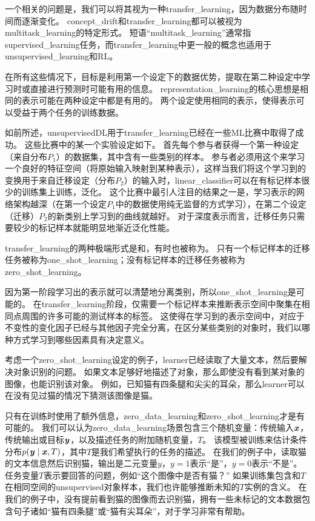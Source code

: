 
一个相关的问题是，我们可以将其视为一种\gls{transfer_learning}，因为数据分布随时间而逐渐变化。
\gls{concept_drift}和\gls{transfer_learning}都可以被视为\gls{multitask_learning}的特定形式。
短语``\gls{multitask_learning}''通常指\gls{supervised_learning}任务，而\gls{transfer_learning}中更一般的概念也适用于\gls{unsupervised_learning}和\gls{RL}。

在所有这些情况下，目标是利用第一个设定下的数据优势，提取在第二种设定中学习时或直接进行预测时可能有用的信息。
\gls{representation_learning}的核心思想是相同的表示可能在两种设定中都是有用的。
两个设定使用相同的表示，使得表示可以受益于两个任务的训练数据。


如前所述，\gls{unsupervised}\gls{DL}用于\gls{transfer_learning}已经在一些\gls{ML}比赛中取得了成功\citep{UTLC+LISA-2011-small,goodfellow+all-NIPS2011}。
这些比赛中的某一个实验设定如下。
首先每个参与者获得一个第一种设定（来自分布$P_1$）的数据集，其中含有一些类别的样本。
参与者必须用这个来学习一个良好的特征空间（将原始输入映射到某种表示），这样当我们将这个学习到的变换用于来自迁移设定（分布$P_2$）的输入时，\gls{linear_classifier}可以在有标记样本很少的训练集上训练，泛化。
这个比赛中最引人注目的结果之一是，学习表示的网络架构越深（在第一个设定$P_1$中的数据使用纯无监督的方式学习），在第二个设定（迁移）$P_2$的新类别上学习到的曲线就越好。
对于深度表示而言，迁移任务只需要较少的标记样本就能明显地渐近泛化性能。


\gls{transfer_learning}的两种极端形式是和，有时也被称为。
只有一个标记样本的迁移任务被称为\gls{one_shot_learning}；没有标记样本的迁移任务被称为\gls{zero_shot_learning}。


因为第一阶段学习出的表示就可以清楚地分离类别，所以\gls{one_shot_learning}\citep{Fei-Fei+al-2006}是可能的。
在\gls{transfer_learning}阶段，仅需要一个标记样本来推断表示空间中聚集在相同点周围的许多可能的测试样本的标签。
这使得在学习到的表示空间中，对应于不变性的变化因子已经与其他因子完全分离，在区分某些类别的对象时，我们以哪种方式学习到哪些因素具有决定意义。


考虑一个\gls{zero_shot_learning}设定的例子，\gls{learner}已经读取了大量文本，然后要解决对象识别的问题。
如果文本足够好地描述了对象，那么即使没有看到某对象的图像，也能识别该对象。
例如，已知猫有四条腿和尖尖的耳朵，那么\gls{learner}可以在没有见过猫的情况下猜测该图像是猫。


只有在训练时使用了额外信息，\gls{zero_data_learning}\citep{Larochelle2008}和\gls{zero_shot_learning}\citep{Palatucci2009,Socher-2013}才是有可能的。
我们可以认为\gls{zero_data_learning}场景包含三个随机变量：传统输入$\boldsymbol{\mathit{x}}$，传统输出或目标$\boldsymbol{\mathit{y}}$，以及描述任务的附加随机变量，$T$。
该模型被训练来估计条件分布$p(\boldsymbol{\mathit{y}} \mid \boldsymbol{\mathit{x}}, T)$，其中$T$是我们希望执行的任务的描述。
在我们的例子中，读取猫的文本信息然后识别猫，输出是二元变量$y$，$y=1$表示``是''，$y=0$表示``不是''。
任务变量$T$表示要回答的问题，例如``这个图像中是否有猫？''
如果训练集包含和$T$在相同空间的\gls{unsupervised}对象样本，我们也许能够推断未知的$T$实例的含义。
在我们的例子中，没有提前看到猫的图像而去识别猫，拥有一些未标记的文本数据包含句子诸如``猫有四条腿''或``猫有尖耳朵''，对于学习非常有帮助。

